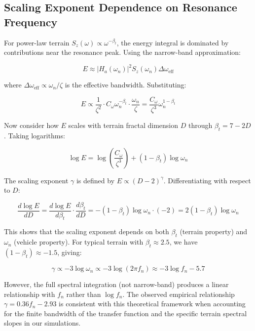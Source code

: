 \documentclass[11pt]{article}
\begin{document}
\subsection{Scaling Exponent Dependence on Resonance Frequency}

For power-law terrain $S_z(\omega) \propto \omega^{-\beta_t}$, the energy integral is dominated by contributions near the resonance peak. Using the narrow-band approximation:

\begin{equation}
E \approx |H_a(\omega_n)|^2 S_z(\omega_n) \Delta\omega_{\text{eff}}
\end{equation}

where $\Delta\omega_{\text{eff}} \propto \omega_n/\zeta$ is the effective bandwidth. Substituting:

\begin{equation}
E \propto \frac{1}{\zeta^2} \cdot C_\omega \omega_n^{-\beta_t} \cdot \frac{\omega_n}{\zeta} = \frac{C_\omega}{\zeta^3} \omega_n^{1-\beta_t}
\end{equation}

Now consider how $E$ scales with terrain fractal dimension $D$ through $\beta_t = 7-2D$. Taking logarithms:

\begin{equation}
\log E = \log\left(\frac{C_\omega}{\zeta^3}\right) + (1-\beta_t) \log \omega_n
\end{equation}

The scaling exponent $\gamma$ is defined by $E \propto (D-2)^\gamma$. Differentiating with respect to $D$:

\begin{equation}
\frac{d \log E}{d D} = \frac{d \log E}{d \beta_t} \cdot \frac{d \beta_t}{d D} = -(1-\beta_t) \log \omega_n \cdot (-2) = 2(1-\beta_t) \log \omega_n
\end{equation}

This shows that the scaling exponent depends on both $\beta_t$ (terrain property) and $\omega_n$ (vehicle property). For typical terrain with $\beta_t \approx 2.5$, we have $(1-\beta_t) \approx -1.5$, giving:

\begin{equation}
\gamma \propto -3 \log \omega_n \propto -3 \log(2\pi f_n) \approx -3 \log f_n - 5.7
\end{equation}

However, the full spectral integration (not narrow-band) produces a linear relationship with $f_n$ rather than $\log f_n$. The observed empirical relationship $\gamma = 0.36 f_n - 2.93$ is consistent with this theoretical framework when accounting for the finite bandwidth of the transfer function and the specific terrain spectral slopes in our simulations.
\end{document}
